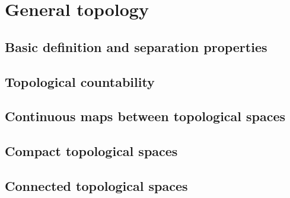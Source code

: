 
\chapter{General topology\label{chap:topology}}

\section{Basic definition and separation properties}

\section{Topological countability}

\section{Continuous maps between topological spaces}

\section{Compact topological spaces}

\section{Connected topological spaces}
